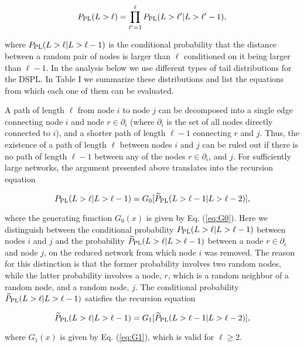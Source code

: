 \documentclass[preprint,pre,superscriptaddress,showpacs]{revtex4}
\begin{document}
\begin{equation}
P_{\rm PL}(L>\ell) = 
\prod_{\ell^{\prime}=1}^{\ell}
P_{\rm PL}(L>\ell^{\prime} | L>\ell^{\prime}-1),
\label{eq:ProdCond}
\end{equation}

\noindent
where $P_{\rm PL}(L>\ell | L>\ell-1)$
is the conditional probability that the distance between
a random pair of nodes is larger than $\ell$ conditioned on
it being larger than $\ell-1$.
In the analysis below we use different types of tail distributions
for the DSPL. In Table I we summarize these distributions and
list the equations from which each one of them can be evaluated.

A path 
of length $\ell$
from node $i$ to node $j$ can be decomposed 
into a single edge connecting node $i$ and node 
$r \in \partial_i$
(where $\partial_i$ is the set of all nodes directly connected to $i$),
and a shorter path of length 
$\ell-1$ connecting $r$ and $j$.
Thus, the existence of a path of length $\ell$
between nodes $i$ and $j$
can be ruled out if there is no path of length
$\ell-1$ between any of the nodes 
$r \in \partial_i$,
and $j$.
For sufficiently large networks,
the argument presented above translates into
the recursion equation
\cite{Nitzan2016}

\begin{equation}
P_{\rm PL}(L > \ell | L>\ell-1) =
G_0[{\widetilde P}_{\rm PL}(L>\ell-1 | L> \ell-2)],
\label{eq:P_rec2}
\end{equation}

\noindent
where the generating function $G_0(x)$ is given by
Eq. (\ref{eq:G0}).
Here we distinguish between the conditional probability
$P_{\rm PL}(L>\ell | L>\ell-1)$ between nodes $i$ and $j$
and the probability
${\widetilde P}_{\rm PL}(L>\ell | L>\ell-1)$ 
between a node $r \in \partial_i$
and node $j$, on the reduced network from which node $i$ was removed.
The reason for this distinction is that the former probability involves two 
random nodes, while the latter probability involves a node, $r$, which is 
a random neighbor of a random node, and a random node, $j$.
The conditional probability 
${\widetilde P}_{\rm PL}(L>\ell | L>\ell-1)$ 
satisfies the recursion equation

\begin{equation}
{\widetilde P}_{\rm PL}(L>\ell | L>\ell-1) =
G_1[ {\widetilde P}_{\rm PL}(L>\ell-1 | L> \ell-2)],
\label{eq:P_rec2s}
\end{equation}

\noindent
where $G_1(x)$ is given by 
Eq. (\ref{eq:G1}),
which is valid for 
$\ell \ge 2$.
\end{document}
